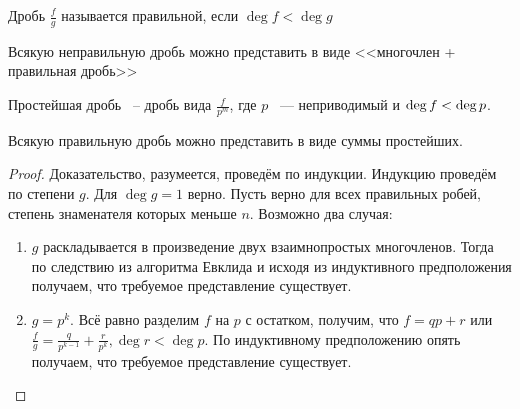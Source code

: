 \begin{df}
Дробь $\frac{f}{g}$ называется правильной, если $\deg f<\deg g$
\end{df}

\begin{theorem}
Всякую неправильную дробь можно представить в виде <<многочлен + правильная дробь>>
\end{theorem}

\begin{df}
 Простейшая дробь ~-- дробь вида $\frac{f}{p^m}$, где $p$ ~--- неприводимый и $\deg f\bw<\deg p$.
\end{df}

\begin{theorem}
Всякую правильную дробь можно представить в виде суммы простейших.
\end{theorem}
\begin{proof}
  Доказательство, разумеется, проведём по индукции. Индукцию проведём по степени $g$. Для $\deg g=1$ верно. Пусть верно для всех правильных робей, степень знаменателя которых меньше $n$. Возможно два случая:
  \begin{enumerate}
    \item $g$ раскладывается в произведение двух взаимнопростых многочленов. Тогда по следствию из алгоритма Евклида и исходя из индуктивного предположения получаем, что требуемое представление существует.
    \item $g=p^k$. Всё равно разделим $f$ на $p$ с остатком, получим, что $f = qp+r$ или $\frac{f}g=\frac{q}{p^{k-1}}+\frac{r}{p^k}, \deg r<\deg p$. По индуктивному предположению опять получаем, что требуемое представление существует.
  \end{enumerate}
\end{proof}
